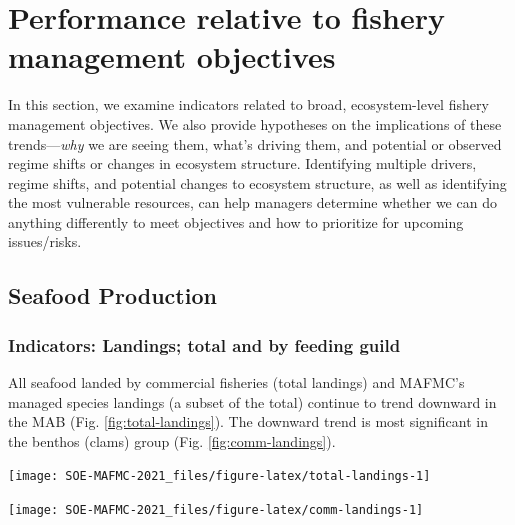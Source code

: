 \documentclass[
  10pt,
]{article}
\let\origfigure\figure
\let\endorigfigure\endfigure
\renewenvironment{figure}[1][2] {
    \expandafter\origfigure\expandafter[H]
} {
    \endorigfigure
}
\begin{document}
\hypertarget{performance-relative-to-fishery-management-objectives}{%
\section{Performance relative to fishery management
objectives}\label{performance-relative-to-fishery-management-objectives}}

In this section, we examine indicators related to broad, ecosystem-level
fishery management objectives. We also provide hypotheses on the
implications of these trends---\emph{why} we are seeing them, what's
driving them, and potential or observed regime shifts or changes in
ecosystem structure. Identifying multiple drivers, regime shifts, and
potential changes to ecosystem structure, as well as identifying the
most vulnerable resources, can help managers determine whether we can do
anything differently to meet objectives and how to prioritize for
upcoming issues/risks.

\hypertarget{seafood-production}{%
\subsection{Seafood Production}\label{seafood-production}}

\hypertarget{indicators-landings-total-and-by-feeding-guild}{%
\subsubsection{Indicators: Landings; total and by feeding
guild}\label{indicators-landings-total-and-by-feeding-guild}}

All seafood landed by commercial fisheries (total landings) and MAFMC's
managed species landings (a subset of the total) continue to trend
downward in the MAB (Fig. \ref{fig:total-landings}). The downward trend
is most significant in the benthos (clams) group (Fig.
\ref{fig:comm-landings}).

\begin{figure}

{\centering \texttt{[image: SOE-MAFMC-2021\_files/figure-latex/total-landings-1]} 

}

\caption{Total commercial seafood landings (black) and Mid-Atlantic managed seafood landings (red).}\label{fig:total-landings}
\end{figure}

\begin{figure}

{\centering \texttt{[image: SOE-MAFMC-2021\_files/figure-latex/comm-landings-1]} 

}

\caption{Total commercial landings (black) and MAFMC managed species landings (red) by feeding guild.}\label{fig:comm-landings}
\end{figure}
\end{document}
